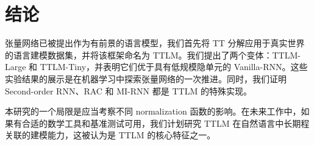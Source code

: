 \section{结论}

张量网络已被提出作为有前景的语言模型，我们首先将 TT 分解应用于真实世界的语言建模数据集，并将该框架命名为 TTLM。我们提出了两个变体：TTLM-Large 和 TTLM-Tiny，并表明它们优于具有低规模隐单元的 Vanilla-RNN。这些实验结果的展示是在机器学习中探索张量网络的一次推进。同时，我们证明 Second-order RNN、RAC 和 MI-RNN 都是 TTLM 的特殊实现。

本研究的一个局限是应当考察不同 normalization 函数的影响。在未来工作中，如果有合适的数学工具和基准测试可用，我们计划研究 TTLM 在自然语言中长期程关联的建模能力，这被认为是 TTLM 的核心特征之一。





















